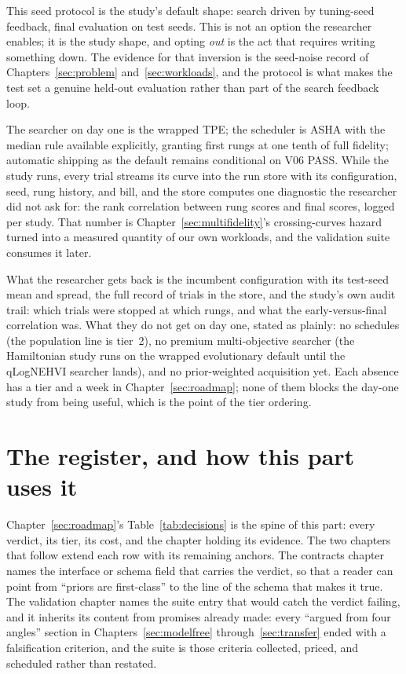 This seed protocol is the study's default shape: search driven by
tuning-seed feedback, final evaluation on test seeds. This is not an
option the researcher enables; it is the study shape, and opting
\emph{out} is the act that requires writing something down. The
evidence for that inversion is the seed-noise record of
Chapters~\ref{sec:problem} and~\ref{sec:workloads}, and the protocol
is what makes the test set a genuine held-out evaluation rather than
part of the search feedback loop.

The searcher on day one is the wrapped TPE; the scheduler is ASHA
with the median rule available explicitly, granting first rungs at one tenth of
full fidelity; automatic shipping as the default remains conditional on V06 PASS.
While the study runs, every trial streams its curve
into the run store with its configuration, seed, rung history, and
bill, and the store computes one diagnostic the researcher did not
ask for: the rank correlation between rung scores and final scores,
logged per study. That number is Chapter~\ref{sec:multifidelity}'s
crossing-curves hazard turned into a measured quantity of our own
workloads, and the validation suite consumes it later.

What the researcher gets back is the incumbent configuration with
its test-seed mean and spread, the full record of trials in the
store, and the study's own audit trail: which trials were stopped at
which rungs, and what the early-versus-final correlation was. What
they do not get on day one, stated as plainly: no schedules (the
population line is tier~2), no premium multi-objective searcher (the
Hamiltonian study runs on the wrapped evolutionary default until the
qLogNEHVI searcher lands), and no prior-weighted acquisition yet.
Each absence has a tier and a week in Chapter~\ref{sec:roadmap};
none of them blocks the day-one study from being useful, which is
the point of the tier ordering.

\section{The register, and how this part uses it}

Chapter~\ref{sec:roadmap}'s Table~\ref{tab:decisions} is the spine
of this part: every verdict, its tier, its cost, and the chapter
holding its evidence. The two chapters that follow extend each row
with its remaining anchors. The contracts chapter names the
interface or schema field that carries the verdict, so that a reader
can point from ``priors are first-class'' to the line of the schema
that makes it true. The validation chapter names the suite entry
that would catch the verdict failing, and it inherits its content
from promises already made: every ``argued from four angles''
section in Chapters~\ref{sec:modelfree}
through~\ref{sec:transfer} ended with a falsification criterion, and
the suite is those criteria collected, priced, and scheduled rather
than restated.

